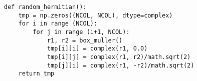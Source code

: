 \begin{lstlisting}
def random_hermitian():
    tmp = np.zeros((NCOL, NCOL), dtype=complex)
    for i in range (NCOL):
        for j in range (i+1, NCOL):
            r1, r2 = box_muller()
            tmp[i][i] = complex(r1, 0.0)
            tmp[i][j] = complex(r1, r2)/math.sqrt(2)
            tmp[j][i] = complex(r1, -r2)/math.sqrt(2)
    return tmp 
\end{lstlisting}